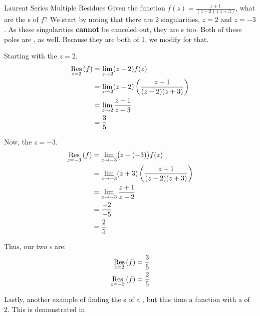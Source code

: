 \begin{example}{Laurent Series Multiple Residues}
  Given the function $f(z) = \frac{z+1}{(z-2) (z+3)}$, what are the s of $f$?
  \tcblower{}
  We start by noting that there are 2 singularities, $z=2$ and $z=-3$.
  As these singularities \textbf{cannot} be canceled out, they are s too.
  Both of these poles are , as well.
  Because they are both of  1, we modify  for that.

  Starting with the  $z=2$.
  \begin{align*}
    \Residue{f}{z=2} &= \lim\limits_{z \to 2} (z-2) f(z) \\
                     &= \lim\limits_{z \to 2} (z-2) \left( \frac{z+1}{(z-2) (z+3)} \right) \\
                     &= \lim\limits_{z \to 2} \frac{z+1}{z+3} \\
                     &= \frac{3}{5} \\
  \end{align*}

  Now, the  $z=-3$.
  \begin{align*}
    \Residue{f}{z=-3} &= \lim\limits_{z \to -3} \bigl( z- (-3) \bigr) f(z) \\
                      &= \lim\limits_{z \to -3} (z+3) \left( \frac{z+1}{(z-2)(z+3)} \right) \\
                      &= \lim\limits_{z \to -3} \frac{z+1}{z-2} \\
                      &= \frac{-2}{-5} \\
                      &= \frac{2}{5}
  \end{align*}

  Thus, our two s are:
  \begin{align*}
    \Residue{f}{z=2} &= \frac{3}{5} \\
    \Residue{f}{z=-3} &= \frac{2}{5}
  \end{align*}
\end{example}

Lastly, another example of finding the s of a , but this time a function with a  of  2.
This is demonstrated in 

